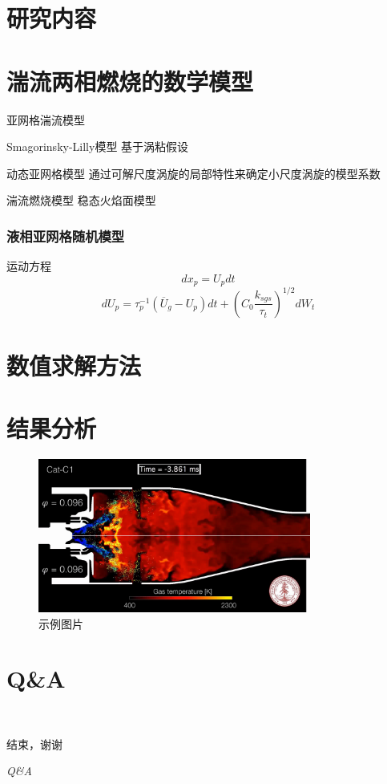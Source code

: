 \documentclass[compress]{beamer}%
\begin{document}
\section{研究内容}
\section{湍流两相燃烧的数学模型}
\begin{frame}{亚网格湍流模型}
  \begin{block}{Smagorinsky-Lilly模型}
    基于涡粘假设
  \end{block}
  \begin{block}{动态亚网格模型}
    通过可解尺度涡旋的局部特性来确定小尺度涡旋的模型系数
  \end{block}
\end{frame}
\begin{frame}{湍流燃烧模型}
稳态火焰面模型
\end{frame}
\begin{frame}
	\frametitle{液相亚网格随机模型}
	\begin{block}{运动方程}
		$$dx_p=U_pdt$$
	\[dU_p=\tau_p^{-1}( {\overline U}_g-U_p)dt+(C_0\frac{k_{sgs}}{\tau_t})^{1/2}dW_t\]
	\end{block}
\end{frame}
\section{数值求解方法}
\section{结果分析}
\begin{frame}{\secname}
    \begin{figure}[b]
        \centering
        \includegraphics[width=0.8\textwidth]{cat-c1-p.png}
        \caption{示例图片}
    \end{figure}
\end{frame}
\section{Q\&A}
\begin{frame}{\secname~ }
	\begin{center}
 		\huge {\kaishu 结束，谢谢}
		
		\huge \textit {Q\&A}
	\end{center}
\end{frame}
\end{document}
